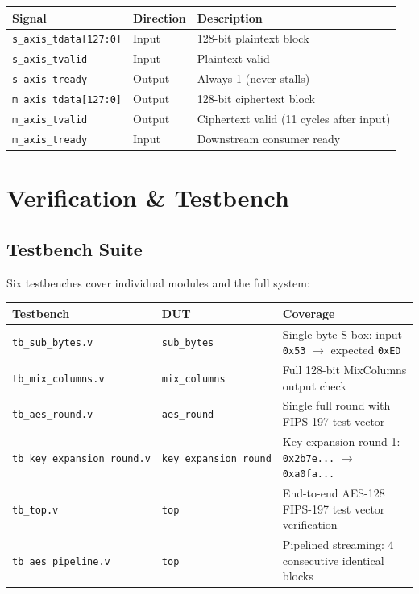 \documentclass[12pt,a4paper]{article}
\begin{document}
\begin{center}
\begin{tabular}{@{}lll@{}}
\toprule
\textbf{Signal} & \textbf{Direction} & \textbf{Description}\\
\midrule
\texttt{s\_axis\_tdata[127:0]}  & Input  & 128-bit plaintext block\\
\texttt{s\_axis\_tvalid}         & Input  & Plaintext valid\\
\texttt{s\_axis\_tready}         & Output & Always 1 (never stalls)\\
\texttt{m\_axis\_tdata[127:0]}  & Output & 128-bit ciphertext block\\
\texttt{m\_axis\_tvalid}         & Output & Ciphertext valid (11 cycles after input)\\
\texttt{m\_axis\_tready}         & Input  & Downstream consumer ready\\
\bottomrule
\end{tabular}
\end{center}

\section{Verification \& Testbench}

\subsection{Testbench Suite}

Six testbenches cover individual modules and the full system:

\begin{table}[H]
\centering
\begin{tabularx}{\textwidth}{@{}llX@{}}
\toprule
\textbf{Testbench} & \textbf{DUT} & \textbf{Coverage}\\
\midrule
\texttt{tb\_sub\_bytes.v}           & \texttt{sub\_bytes}         & Single-byte S-box: input \texttt{0x53} $\to$ expected \texttt{0xED}\\
\texttt{tb\_mix\_columns.v}         & \texttt{mix\_columns}       & Full 128-bit MixColumns output check\\
\texttt{tb\_aes\_round.v}           & \texttt{aes\_round}         & Single full round with FIPS-197 test vector\\
\texttt{tb\_key\_expansion\_round.v}& \texttt{key\_expansion\_round} & Key expansion round 1: \texttt{0x2b7e...} $\to$ \texttt{0xa0fa...}\\
\texttt{tb\_top.v}                  & \texttt{top}                & End-to-end AES-128 FIPS-197 test vector verification\\
\texttt{tb\_aes\_pipeline.v}        & \texttt{top}                & Pipelined streaming: 4 consecutive identical blocks\\
\bottomrule
\end{tabularx}
\end{table}
\end{document}
